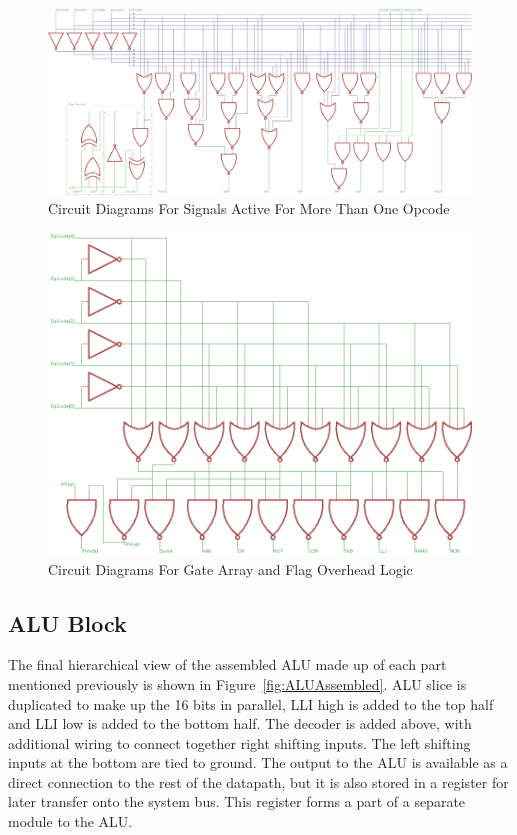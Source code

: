 \begin{figure}[h]
	\centering
	\includegraphics[width=\textwidth]{Figures/ALUDecoderMore1v2.png}
	\caption{Circuit Diagrams For Signals Active For More Than One Opcode}
	\label{fig:DecMultiCirs}
\end{figure}

\begin{figure}[h]
	\centering
	\includegraphics[scale=0.75]{Figures/ALUDecoderGateArrayv2.png}
	\caption{Circuit Diagrams For Gate Array and Flag Overhead Logic}
	\label{fig:GateArray}
\end{figure}

\subsection{ALU Block}
The final hierarchical view of the assembled ALU made up of each part mentioned previously is shown in Figure~\ref{fig:ALUAssembled}. 
ALU slice is duplicated to make up the 16 bits in parallel, LLI high is added to the top half and LLI low is added to the bottom half. 
The decoder is added above, with additional wiring to connect together right shifting inputs. 
The left shifting inputs at the bottom are tied to ground. 
The output to the ALU is available as a direct connection to the rest of the datapath, but it is also stored in a register for later transfer onto the system bus. 
This register forms a part of a separate module to the ALU. 

